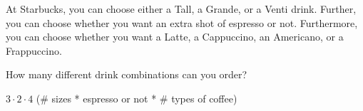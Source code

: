 \question At Starbucks, you can choose either a Tall, a Grande, or 
a Venti drink. Further, you can choose whether you want an extra 
shot of espresso or not. Furthermore, you can choose whether you
want a Latte, a Cappuccino, an Americano, or a Frappuccino. 

How many different drink combinations can you order?
\begin{solution}[0.5 in]
    $3 \cdot 2 \cdot 4$ (\# sizes * espresso or not * \# types of coffee)
\end{solution}